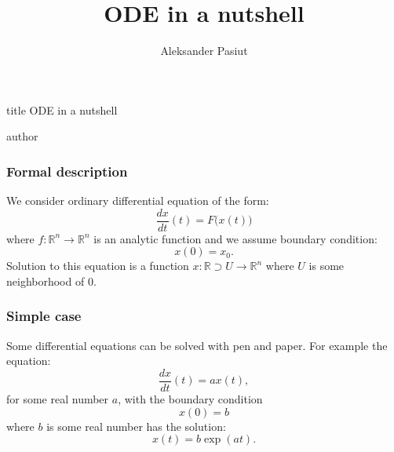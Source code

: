 \documentclass[aspectratio=169]{beamer}
\title{ODE in a nutshell}
\author[APasiut]{Aleksander Pasiut}
\begin{document}

\begin{frame}

    \vskip1cm
    \begin{beamercolorbox}[wd=\paperwidth]{title}
        \centering
        ODE in a nutshell
    \end{beamercolorbox}
    \vskip2cm
    \begin{beamercolorbox}[wd=\paperwidth]{author}
        \centering
        \insertauthor
    \end{beamercolorbox}

\end{frame}

\begin{frame}
\frametitle{Formal description}

    We consider ordinary differential equation of the form:
    \begin{equation}
        \frac{dx}{dt} (t) = F \big( x(t) \big)
    \end{equation}
    where $f : \mathbb{R}^n \to \mathbb{R}^n$ is an analytic function and we assume boundary condition:
    \begin{equation}
        x(0) = x_0.
    \end{equation}
    Solution to this equation is a function $x : \mathbb{R} \supset U \to \mathbb{R}^n$ where $U$ is some neighborhood of $0$.

\end{frame}

\begin{frame}
\frametitle{Simple case}

    Some differential equations can be solved with pen and paper. For example the equation:
    \begin{equation}
        \frac{dx}{dt} (t) = a x(t),
    \end{equation}
    for some real number $a$, with the boundary condition
    \begin{equation}
        x(0) = b
    \end{equation}
    where $b$ is some real number has the solution:
    \begin{equation}
        x(t) = b \exp( at ).
    \end{equation}

\end{frame}
\end{document}
